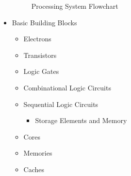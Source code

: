 \begin{itemize}
\begin{itemize}
    \end{itemize}

    \begin{figure}[h!]
      \centering
      
      \caption{Processing System Flowchart}
      \label{fig:1}
    \end{figure}

  \item Basic Building Blocks

    \begin{itemize}

      \item Electrons

      \item Transistors

      \item Logic Gates

      \item Combinational Logic Circuits

      \item Sequential Logic Circuits

        \begin{itemize}

          \item Storage Elements and Memory

        \end{itemize}

      \item Cores

      \item Memories

      \item Caches

    \end{itemize}

\end{itemize}



